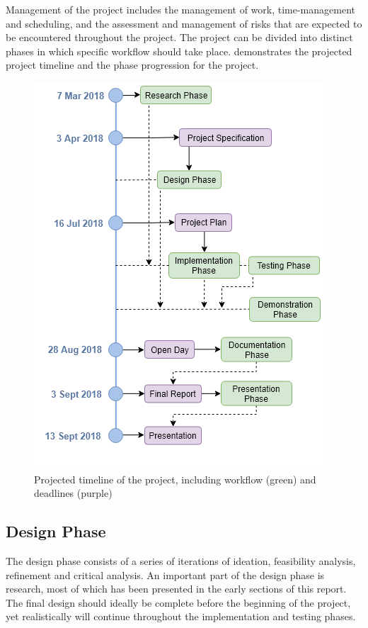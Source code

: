 \documentclass[10pt,twocolumn]{witseiepaper}
\begin{document}
	Management of the project includes the management of work, time-management and scheduling, and the assessment and management of risks that are expected to be encountered throughout the project. The project can be divided into distinct phases in which specific workflow should take place.  demonstrates the projected project timeline and the phase progression for the project.
	
	\begin{figure}
		\centering
		\includegraphics[width=1\columnwidth]{media/timeline.png}
		\caption{Projected timeline of the project, including workflow (green) and deadlines (purple)}
		\raggedright
		\label{fig:timeline}
	\end{figure}
	
	\subsection{Design Phase}
		The design phase consists of a series of iterations of ideation, feasibility analysis, refinement and critical analysis. An important part of the design phase is research, most of which has been presented in the early sections of this report. The final design should ideally be complete before the beginning of the project, yet realistically will continue throughout the implementation and testing phases. 
		
\end{document}
